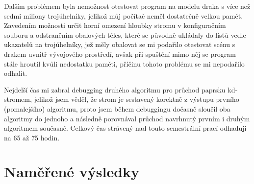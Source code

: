 \documentclass[report,11pt]{elsarticle}
\begin{document}
Dalším problémem byla nemožnost otestovat program na modelu draka s více než sedmi miliony trojúhelníky, jelikož můj počítač neměl dostatečně velkou paměť. Zavedením možnosti určit horní omezení hloubky stromu v konfiguračním souboru a odstraněním obalových těles, které se původně ukládaly do listů vedle ukazatelů na trojúhelníky, jež měly obalovat se mi podařilo otestovat scénu s drakem uvnitř vývojového prostředí, avšak při spuštění mimo něj se program stále hroutil kvůli nedostatku paměti, příčinu tohoto problému se mi nepodařilo odhalit.

Nejdelší čas mi zabral debugging druhého algoritmu  pro průchod paprsku kd-stromem, jelikož jsem věděl, že strom je sestavený korektně z výstupu prvního (pomalejšího) algoritmu, proto jsem během debuggingu dočasně sloučil oba algoritmy do jednoho a následně porovnával průchod navrhnutý prvním i druhým algoritmem současně.
Celkový čas strávený nad touto semestrální prací odhaduji na 65 až 75 hodin.

\section{\label{SEC:Results}Naměřené výsledky}
\end{document}
